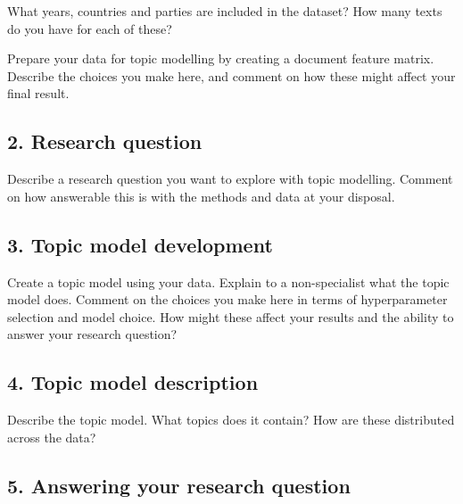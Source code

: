 \documentclass[
]{article}
\begin{document}
What years, countries and parties are included in the dataset? How many
texts do you have for each of these?

\begin{quote}
\end{quote}

Prepare your data for topic modelling by creating a document feature
matrix. Describe the choices you make here, and comment on how these
might affect your final result.

\hypertarget{research-question}{%
\subsection{2. Research question}\label{research-question}}

Describe a research question you want to explore with topic modelling.
Comment on how answerable this is with the methods and data at your
disposal.

\begin{quote}
\end{quote}

\hypertarget{topic-model-development}{%
\subsection{3. Topic model development}\label{topic-model-development}}

Create a topic model using your data. Explain to a non-specialist what
the topic model does. Comment on the choices you make here in terms of
hyperparameter selection and model choice. How might these affect your
results and the ability to answer your research question?

\begin{quote}
\end{quote}

\hypertarget{topic-model-description}{%
\subsection{4. Topic model description}\label{topic-model-description}}

Describe the topic model. What topics does it contain? How are these
distributed across the data?

\begin{quote}
\end{quote}

\hypertarget{answering-your-research-question}{%
\subsection{5. Answering your research
question}\label{answering-your-research-question}}
\end{document}
